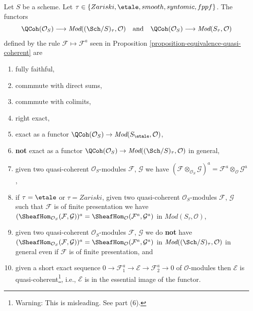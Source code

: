 \begin{lemma}
\label{lemma-equivalence-quasi-coherent-limits}
Let $S$ be a scheme.
Let $\tau \in \{Zariski, \linebreak[0] \etale,
\linebreak[0] smooth, \linebreak[0] syntomic, \linebreak[0] fppf\}$.
The functors
$$
\QCoh(\mathcal{O}_S)
\longrightarrow
\textit{Mod}((\Sch/S)_\tau, \mathcal{O})
\quad\text{and}\quad
\QCoh(\mathcal{O}_S)
\longrightarrow
\textit{Mod}(S_\tau, \mathcal{O})
$$
defined by the rule $\mathcal{F} \mapsto \mathcal{F}^a$ seen in
Proposition \ref{proposition-equivalence-quasi-coherent}
are
\begin{enumerate}
\item fully faithful,
\item commmute with direct sums,
\item commmute with colimits,
\item right exact,
\item exact as a functor
$\QCoh(\mathcal{O}_S) \to \textit{Mod}(S_\etale, \mathcal{O})$,
\item {\bf not} exact as a functor
$\QCoh(\mathcal{O}_S) \to
\textit{Mod}((\Sch/S)_\tau, \mathcal{O})$
in general,
\item given two quasi-coherent $\mathcal{O}_S$-modules
$\mathcal{F}$, $\mathcal{G}$ we have
$(\mathcal{F} \otimes_{\mathcal{O}_S} \mathcal{G})^a =
\mathcal{F}^a \otimes_\mathcal{O} \mathcal{G}^a$,
\item if $\tau = \etale$ or $\tau = Zariski$,
given two quasi-coherent $\mathcal{O}_S$-modules
$\mathcal{F}$, $\mathcal{G}$ such that $\mathcal{F}$
is of finite presentation we have
$(\SheafHom_{\mathcal{O}_S}(\mathcal{F}, \mathcal{G}))^a =
\SheafHom_\mathcal{O}(\mathcal{F}^a, \mathcal{G}^a)$ in
$\textit{Mod}(S_\tau, \mathcal{O})$,
\item given two quasi-coherent $\mathcal{O}_S$-modules
$\mathcal{F}$, $\mathcal{G}$ we do {\bf not} have
$(\SheafHom_{\mathcal{O}_S}(\mathcal{F}, \mathcal{G}))^a =
\SheafHom_\mathcal{O}(\mathcal{F}^a, \mathcal{G}^a)$
in $\textit{Mod}((\Sch/S)_\tau, \mathcal{O})$ in general
even if $\mathcal{F}$ is of finite presentation, and
\item given a short exact sequence
$0 \to \mathcal{F}_1^a \to \mathcal{E} \to \mathcal{F}_2^a \to 0$
of $\mathcal{O}$-modules then $\mathcal{E}$ is
quasi-coherent\footnote{Warning: This is misleading. See part (6).}, i.e.,
$\mathcal{E}$ is in the essential image of the functor.
\end{enumerate}
\end{lemma}

